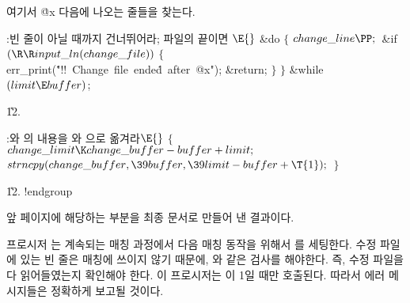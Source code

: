 {여기서 \.{@x} 다음에 나오는 줄들을 찾는다.

\Y\B\4:빈 줄이 아닐 때까지 건너뛰어라; 파일의 끝이면 \X${}\E{}$\6
\&{do}\5
${}\{{}$\1\6
${}\\{change\_line}\PP;{}$\6
\&{if} ${}(\R\R\\{input\_ln}(\\{change\_file})){}$\5
${}\{{}$\1\6
\\{err\_print}(\.{"!!\ Change\ file\ ende}\)\.{d\ after\ @x"});\6
\&{return};\6
\4${}\}{}$\2\6
\4${}\}{}$\2\5
\&{while} ${}(\\{limit}\E\\{buffer}){}$;\par
\U12.\fi

\B{}:와 의 내용을 와 으로 옮겨라\X${}\E{}$\6
${}\{{}$\1\6
${}\\{change\_limit}\K\\{change\_buffer}-\\{buffer}+\\{limit};{}$\6
${}\\{strncpy}(\\{change\_buffer},\39\\{buffer},\39\\{limit}-\\{buffer}+%
\T{1});{}$\6
\4${}\}{}$\2\par\U12.\fi
!endgroup
\vfil\eject

\tenpoint
\def\inote#1#2#3.{\Y\noindent{\hangindent2em%
  \baselineskip10pt\eightrm\eightmj%
    #1~\ifacro{\pdfnote#3.}\else#3\fi#2.\par}}
\def\U{\inote{이 코드는}{번 섹션에서 사용됩니다}}

\def\runninghead{\headlinefont 부록 A --- 최종 문서}

앞 페이지에 해당하는 부분을 최종 문서로 만들어 낸 결과이다.

프로시저 는 계속되는 매칭 과정에서 다음 
매칭 동작을 위해서 를 세팅한다. 수정 파일에 있는 빈 줄은
매칭에 쓰이지 않기 때문에, 와 같은 검사를 해야한다. 즉, 수정 파일을 다 읽어들였는지 확인해야
한다. 이 프로시저는 이 1일 때만 호출된다. 
따라서 에러 메시지들은 정확하게 보고될 것이다.

}

